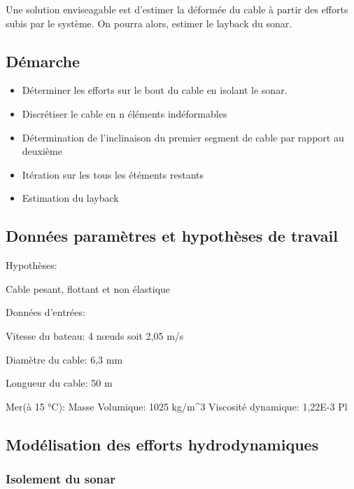 \documentclass[12pt,a4paper]{article}
\begin{document}
Une solution enviseagable est d'estimer la déformée du cable à partir des efforts subis par le système. On pourra alors, estimer le layback du sonar.


\subsection{Démarche}


\begin{itemize}


  \item Déterminer les efforts sur le bout du cable en isolant le sonar.


  \item Discrétiser le cable en n éléments indéformables


  \item Détermination de l'inclinaison du premier segment de cable par rapport au deuxième


  \item Itération sur les tous les étéments restants


  \item Estimation du layback


\end{itemize}






\subsection{Données paramètres et hypothèses de travail}


Hypothèses:


  \item  Cable pesant, flottant et non élastique


Données d'entrées:


Vitesse du bateau: 4 nœuds soit 2,05 m/s


Diamètre du cable: 6,3 mm


Longueur du cable: 50 m


Mer(à 15 °C): Masse Volumique: 1025 kg/m^3    Viscosité dynamique: 1,22E-3 Pl


\subsection{Modélisation des efforts hydrodynamiques}


\subsubsection{Isolement du sonar}
\end{document}
